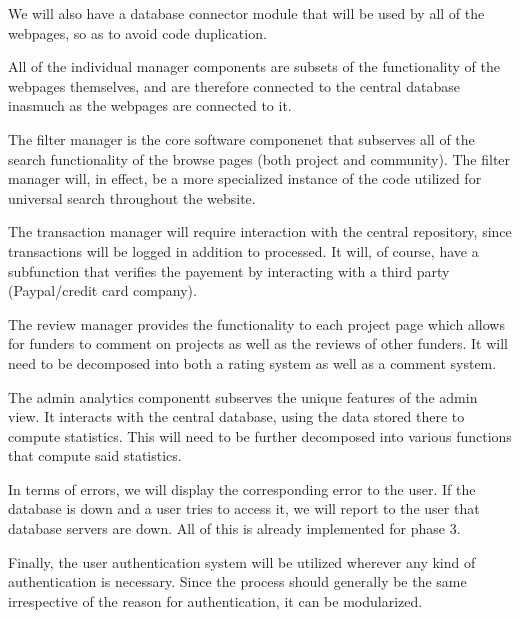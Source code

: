 \documentclass[12pt]{article}
\begin{document}
\begin{enumerate}
We will also have a database connector module that will be used by all of the webpages, so as to avoid code duplication.

All of the individual manager components are subsets of the functionality of the webpages themselves, and are therefore connected to the central database inasmuch as the webpages are connected to it.

The filter manager is the core software componenet that subserves all of the search functionality of the browse pages (both project and community). The filter manager will, in effect, be a more specialized instance of the code utilized for universal search throughout the website.

The transaction manager will require interaction with the central repository, since transactions will be logged in addition to processed. It will, of course, have a subfunction that verifies the payement by interacting with a third party (Paypal/credit card company).

The review manager provides the functionality to each project page which allows for funders to comment on projects as well as the reviews of other funders. It will need to be decomposed into both a rating system as well as a comment system.

The admin analytics componentt subserves the unique features of the admin view. It interacts with the central database, using the data stored there to compute statistics. This will need to be further decomposed into various functions that compute said statistics.

In terms of errors, we will display the corresponding error to the user. If the database is down and a user tries to access it, we will report to the user that database servers are down. All of this is already implemented for phase 3.


Finally, the user authentication system will be utilized wherever any kind of authentication is necessary. Since the process should generally be the same irrespective of the reason for authentication, it can be modularized.



\end{enumerate}
\end{document}
